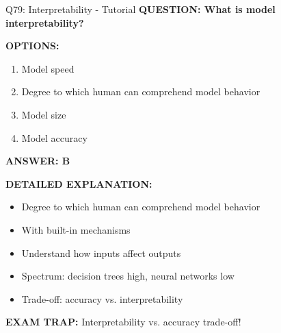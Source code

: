 \documentclass[8pt]{beamer}
\begin{document}
	\begin{frame}{Q79: Interpretability - Tutorial}
		\fontsize{6.5}{7.5}\selectfont
		\textbf{QUESTION: What is model interpretability?}
		
		\vspace{0.1cm}
		\textbf{OPTIONS:}
		\begin{enumerate}
			\item Model speed
			\item Degree to which human can comprehend model behavior
			\item Model size
			\item Model accuracy
		\end{enumerate}
		
		\vspace{0.1cm}
		\textcolor{myblue}{\textbf{ANSWER: B}}
		
		\vspace{0.1cm}
		\textbf{DETAILED EXPLANATION:}
		\begin{itemize}
			\item Degree to which human can comprehend model behavior
			\item With built-in mechanisms
			\item Understand how inputs affect outputs
			\item Spectrum: decision trees high, neural networks low
			\item Trade-off: accuracy vs. interpretability
		\end{itemize}
		
		\vspace{0.1cm}
		\textcolor{myred}{\textbf{EXAM TRAP:}} Interpretability vs. accuracy \textcolor{myblue}{trade-off}!
	\end{frame}
	
\end{document}

